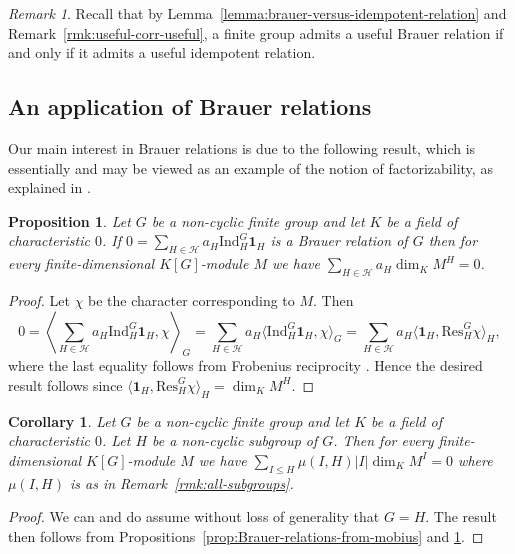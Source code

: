 \documentclass[12pt]{amsart}
\theoremstyle{plain}
\newtheorem{corollary}[theorem]{Corollary}
\newtheorem{prop}[theorem]{Proposition}
\theoremstyle{remark}
\newtheorem{remark}[theorem]{Remark}
\theoremstyle{definition}
\newcommand{\Res}{\mathrm{Res}}
\newcommand{\Ind}{\mathrm{Ind}}
\numberwithin{equation}{section}
\begin{document}
\begin{remark}
Recall that by Lemma~\ref{lemma:brauer-versus-idempotent-relation} and Remark~\ref{rmk:useful-corr-useful}, a finite group admits a useful Brauer relation if and only if it admits a useful idempotent relation.
\end{remark}

\subsection{An application of Brauer relations}
Our main interest in Brauer relations is due to the following result, which
is essentially \cite[Lemma 4.1]{MR1269254} and may be viewed
as an example of the notion of factorizability, as explained in \cite[\S 2]{MR1426445}.

\begin{prop}\cite{MR1269254}\label{prop:brauer-relation-dim-formula}
Let $G$ be a non-cyclic finite group and let $K$ be a field of characteristic $0$.
If $0=\sum_{H \in \mathcal{H}} a_{H} \Ind_{H}^{G}\mathbf{1}_{H}$ is a Brauer relation of $G$
then for every finite-dimensional $K[G]$-module $M$ we have
$\sum_{H \in \mathcal{H}} a_{H} \dim_{K} M^{H} = 0$.
\end{prop}

\begin{proof}
Let $\chi$ be the character corresponding to $M$. Then
\[
\textstyle{
0
=\left\langle\sum_{H \in \mathcal{H}} a_{H} \Ind_{H}^{G}\mathbf{1}_{H},\chi\right\rangle_{G}
=\sum_{H \in \mathcal{H}}a_{H}\langle\Ind_{H}^{G}\mathbf{1}_{H},\chi\rangle_{G}
=\sum_{H \in \mathcal{H}}a_{H}\langle\mathbf{1}_{H},\Res_{H}^{G} \chi \rangle_{H},}
\]
where the last equality follows from Frobenius reciprocity \cite[(10.9)]{MR632548}.
Hence the desired result follows since
$\langle\mathbf{1}_{H},\Res_{H}^{G} \chi \rangle_{H}=\dim_{K} M^{H}$.
\end{proof}

\begin{corollary}\label{cor:brauer-relation-dim-formula}
Let $G$ be a non-cyclic finite group and let $K$ be a field of characteristic $0$.
Let $H$ be a non-cyclic subgroup of $G$. 
Then for every finite-dimensional $K[G]$-module $M$ we have
$\sum_{I \leq H} \mu(I,H) |I| \dim_{K} M^{I} = 0$
where $\mu(I,H)$ is as in Remark~\ref{rmk:all-subgroups}.
\end{corollary}

\begin{proof}
We can and do assume without loss of generality that $G=H$.
The result then follows from Propositions~\ref{prop:Brauer-relations-from-mobius} and \ref{prop:brauer-relation-dim-formula}.
\end{proof}
\end{document}
